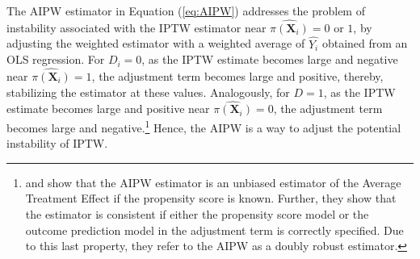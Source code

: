 The AIPW estimator in Equation (\ref{eq:AIPW}) addresses the problem of instability associated with the IPTW estimator near $\hat{\pi(\boldsymbol{X}_i)} = 0$ or $1$, by adjusting the weighted estimator with a weighted average of $\hat{Y_i}$ obtained from an OLS regression. For $D_i = 0$, as the IPTW estimate becomes large and negative near $\hat{\pi(\boldsymbol{X}_i)} = 1$, the adjustment term becomes large and positive, thereby, stabilizing the estimator at these values. Analogously, for $D = 1$, as the IPTW estimate becomes large and positive near $\hat{\pi(\boldsymbol{X}_i)} = 0$, the adjustment term becomes large and negative.\footnote{\citet{Tsiatis_2006_Semiparametric-Theory} and \citet{Glynn-Quinn_2010_Political-Analysis} show that the AIPW estimator is an unbiased estimator of the Average Treatment Effect if the propensity score is known. Further, they show that the estimator is consistent if either the propensity score model or the outcome prediction model in the adjustment term is correctly specified. Due to this last property, they refer to the AIPW as a doubly robust estimator.}  Hence, the AIPW is a way to adjust the potential instability of IPTW.

